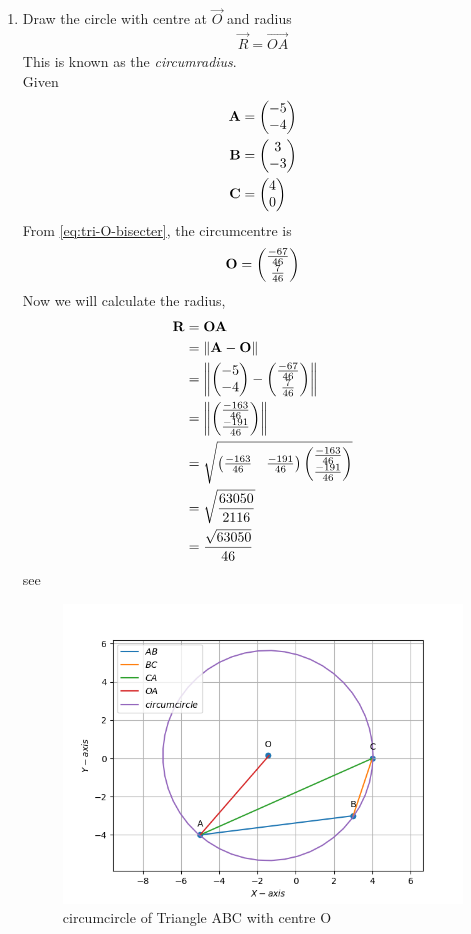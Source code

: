 \documentclass[10pt]{book}
\begin{document}
\begin{enumerate}[label=\thesection.\arabic*.,ref=\thesection.\theenumi]
\item Draw the circle with centre at $\vec{O}$ and radius 
\begin{align}
\vec{R} = \vec{OA}
\end{align}
This is known as the {\em circumradius}. \\
\solution
Given
\begin{align}
\mathbf{A} &= \begin{pmatrix}-5\\-4\end{pmatrix}\\
\mathbf{B} &= \begin{pmatrix}3\\-3\end{pmatrix}\\
\mathbf{C} &= \begin{pmatrix}4\\0\end{pmatrix}
\end{align}
From \eqref{eq:tri-O-bisecter}, the circumcentre is
\begin{align}
\mathbf{O} = \begin{pmatrix}\frac{-67}{46}\\ \frac{7}{46}\end{pmatrix}
\end{align}
Now we will calculate the radius,
\begin{align}
      \mathbf{R} &= \mathbf{OA}\\
        &= \left\lVert\mathbf{A} - \mathbf{O}\right\rVert\\
        &= \left\lVert\begin{pmatrix}-5\\-4\end{pmatrix} - \begin{pmatrix}\frac{-67}{46}\\ \frac{7}{46}\end{pmatrix}\right\rVert\\
        &= \left\lVert\begin{pmatrix}\frac{-163}{46}\\ \frac{-191}{46}\end{pmatrix}\right\rVert\\
        &=\sqrt{\begin{pmatrix}\frac{-163}{46} & \frac{-191}{46}\end{pmatrix}\begin{pmatrix}\frac{-163}{46}\\ \frac{-191}{46}\end{pmatrix}} \\
        &= \sqrt{\frac{63050}{2116}} \\
        &= \frac{\sqrt{63050}}{46}
\end{align}
see 
\begin{figure}[H]
\centering
\includegraphics[width=\columnwidth]{figs/circumradius_o.png}
\caption{circumcircle of Triangle ABC with centre O}
\label{fig:circumcircle with centre O}	
\end{figure}


\end{enumerate}
\end{document}
